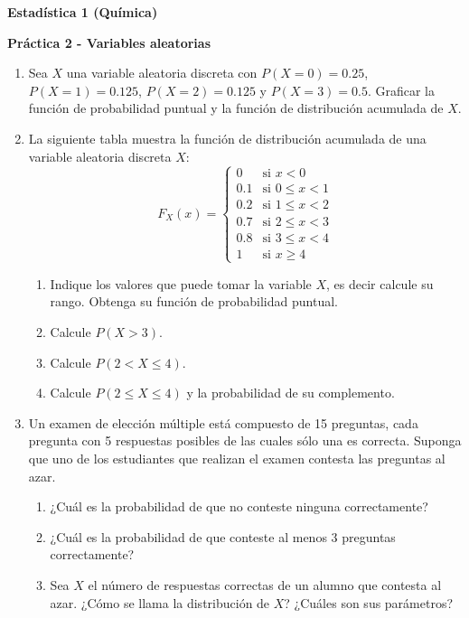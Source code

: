 \documentclass[a4paper, 11pt]{article}
\begin{document}
\centerline{\bf Estadística 1 (Química)}%

\medskip

\centerline{\bf Práctica 2 - Variables aleatorias}%

\begin{enumerate}
    \item Sea $X$ una variable aleatoria discreta con $P(X = 0) = 0.25$, $P(X = 1) = 0.125$, $P(X = 2) = 0.125$ y $P(X = 3) = 0.5$. Graficar la función de probabilidad puntual y la función de distribución acumulada de $X$.
    
    \item La siguiente tabla muestra la función de distribución acumulada de una variable aleatoria discreta $X$:
    \[
    F_X(x) = 
    \begin{cases}
    0 & \text{si } x < 0 \\
    0.1 & \text{si } 0 \leq x < 1 \\
    0.2 & \text{si } 1 \leq x < 2 \\
    0.7 & \text{si } 2 \leq x < 3 \\
    0.8 & \text{si } 3 \leq x < 4 \\
    1 & \text{si } x \geq 4
    \end{cases}
    \]
    \begin{enumerate}
        \item Indique los valores que puede tomar la variable $X$, es decir calcule su rango. Obtenga su función de probabilidad puntual.
        \item Calcule $P(X > 3)$.
        \item Calcule $P(2 < X \leq 4)$.
        \item Calcule $P(2 \leq X \leq 4)$ y la probabilidad de su complemento.
    \end{enumerate}
    
    \item Un examen de elección múltiple está compuesto de 15 preguntas, cada pregunta con 5 respuestas posibles de las cuales sólo una es correcta. Suponga que uno de los estudiantes que realizan el examen contesta las preguntas al azar.
    \begin{enumerate}
        \item ¿Cuál es la probabilidad de que no conteste ninguna correctamente?
        \item ¿Cuál es la probabilidad de que conteste al menos 3 preguntas correctamente?
        \item Sea $X$ el número de respuestas correctas de un alumno que contesta al azar. ¿Cómo se llama la distribución de $X$? ¿Cuáles son sus parámetros?
    \end{enumerate}
    

\end{enumerate}
\end{document}
